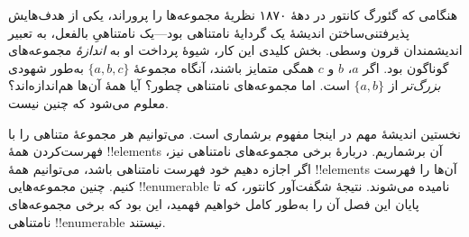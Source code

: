 \documentclass[../../../include/open-logic-section]{subfiles}
\begin{document}


هنگامی که گئورگ کانتور در دههٔ ۱۸۷۰ نظریهٔ مجموعه‌ها را پروراند، یکی
از هدف‌هایش پذیرفتنی‌ساختن اندیشهٔ یک گردایهٔ نامتناهی بود---یک نامتناهیِ
بالفعل، به تعبیر اندیشمندان قرون وسطی. بخش کلیدی این کار، شیوهٔ پرداخت
او به \emph{اندازهٔ} مجموعه‌های گوناگون بود. اگر $a$، $b$ و $c$
همگی متمایز باشند، آنگاه مجموعهٔ $\{a, b, c\}$ به‌طور شهودی
\emph{بزرگ‌تر} از $\{a, b\}$ است. اما مجموعه‌های نامتناهی چطور؟ آیا
همهٔ آن‌ها هم‌اندازه‌اند؟ معلوم می‌شود که چنین نیست.

نخستین اندیشهٔ مهم در اینجا مفهوم برشماری است. می‌توانیم هر مجموعهٔ
متناهی را با فهرست‌کردن همهٔ !!{element}s آن برشماریم. دربارهٔ برخی
مجموعه‌های نامتناهی نیز، اگر اجازه دهیم خود فهرست نامتناهی باشد،
می‌توانیم همهٔ !!{element}s آن‌ها را فهرست کنیم. چنین مجموعه‌هایی
!!{enumerable} نامیده می‌شوند. نتیجهٔ شگفت‌آور کانتور، که تا پایان این
فصل آن را به‌طور کامل خواهیم فهمید، این بود که برخی مجموعه‌های نامتناهی
!!{enumerable} نیستند.
\end{document}

